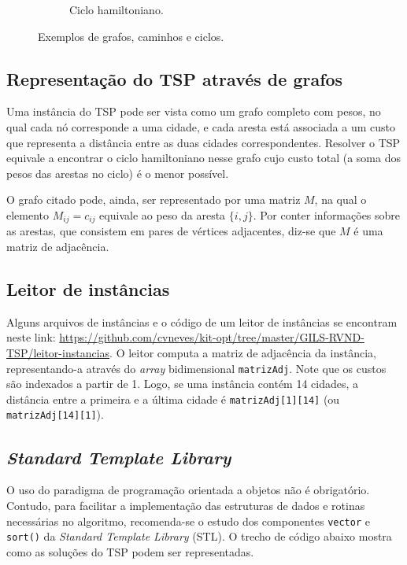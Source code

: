 \begin{figure}
\begin{subfigure}{.3\textwidth}
{
}
	\caption{Ciclo hamiltoniano.}
	\label{fig:grafoCicloHamiltoniano}
\end{subfigure}
	\caption{Exemplos de grafos, caminhos e ciclos.}
	\label{fig:grafoExemplos}
\end{figure}



\subsection{Representação do TSP através de grafos}
Uma instância do TSP pode ser vista como um grafo completo com pesos, no qual cada nó corresponde a uma cidade, e cada aresta está associada a um custo que representa a distância entre as duas cidades correspondentes. Resolver o TSP equivale a encontrar o ciclo hamiltoniano nesse grafo cujo custo total (a soma dos pesos das arestas no ciclo) é o menor possível. 

O grafo citado pode, ainda, ser representado por uma matriz $M$, na qual o elemento $M_{ij} = c_{ij}$ equivale ao peso da aresta $\{i,j\}$. Por conter informações sobre as arestas, que consistem em pares de vértices adjacentes, diz-se que $M$ é uma matriz de adjacência.

\subsection{Leitor de instâncias}
Alguns arquivos de instâncias e o código de um leitor de instâncias se encontram neste link: \url{https://github.com/cvneves/kit-opt/tree/master/GILS-RVND-TSP/leitor-instancias}. O leitor computa a matriz de adjacência da instância, representando-a através do \textit{array} bidimensional \texttt{matrizAdj}. Note que os custos são indexados a partir de 1. Logo, se uma instância contém 14 cidades, a distância entre a primeira e a última cidade é \texttt{matrizAdj[1][14]} (ou \texttt{matrizAdj[14][1]}). 

\subsection{\textit{Standard Template Library}}
O uso do paradigma de programação orientada a objetos não é obrigatório. Contudo, para facilitar a implementação das estruturas de dados e rotinas necessárias no algoritmo, recomenda-se o estudo dos componentes \texttt{vector} e \texttt{sort()} da \textit{Standard Template Library} (STL). O trecho de código abaixo mostra como as soluções do TSP podem ser representadas. 

